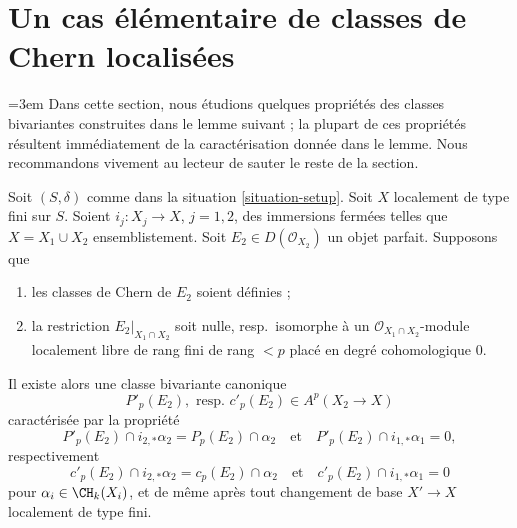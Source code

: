 \section{Un cas élémentaire de classes de Chern localisées}
\label{section-preparation-localized-chern}

{\emergencystretch=3em\noindent
Dans cette section, nous étudions quelques propriétés des classes bivariantes
construites dans le lemme suivant ; la plupart de ces propriétés résultent
immédiatement de la caractérisation donnée dans le lemme. Nous recommandons vivement au
lecteur de sauter le reste de la section.\par}

\begin{lemma}
\label{lemma-silly}
Soit $(S, \delta)$ comme dans la situation \ref{situation-setup}. Soit $X$
localement de type fini sur $S$. Soient $i_j : X_j \to X$, $j = 1, 2$,
des immersions fermées telles que $X = X_1 \cup X_2$ ensemblistement. Soit
$E_2 \in D(\mathcal{O}_{X_2})$ un objet parfait. Supposons que
\begin{enumerate}
\item les classes de Chern de $E_2$ soient définies ;
\item la restriction $E_2|_{X_1 \cap X_2}$ soit nulle,
resp.\ isomorphe à un $\mathcal{O}_{X_1 \cap X_2}$-module localement libre de rang fini
de rang $< p$ placé en degré cohomologique $0$.
\end{enumerate}
Il existe alors une classe bivariante canonique
$$
P'_p(E_2),\text{ resp. }c'_p(E_2) \in A^p(X_2 \to X)
$$
caractérisée par la propriété
$$
P'_p(E_2) \cap i_{2, *} \alpha_2 = P_p(E_2) \cap \alpha_2
\quad\text{et}\quad
P'_p(E_2) \cap i_{1, *} \alpha_1 = 0,
$$
respectivement
$$
c'_p(E_2) \cap i_{2, *} \alpha_2 = c_p(E_2) \cap \alpha_2
\quad\text{et}\quad
c'_p(E_2) \cap i_{1, *} \alpha_1 = 0
$$
pour $\alpha_i \in \CH_k(X_i)$, et de même après tout changement de base
$X' \to X$ localement de type fini.
\end{lemma}

